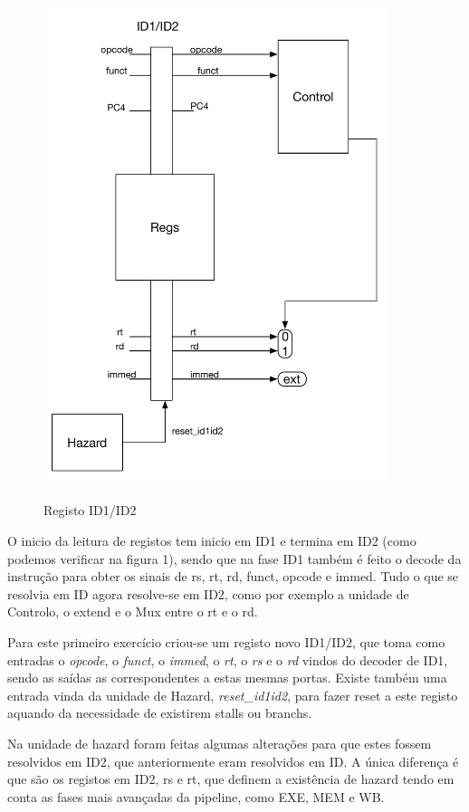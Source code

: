 \documentclass[pdftex,12pt,a4paper]{report}
\begin{document}
\begin{figure}[!htb]
\center
 \includegraphics[width=100mm,scale=1]{ID1ID2ex1.pdf}
 \caption{\\ Registo ID1/ID2}
 \label{fig:ex1RegID1ID2}
\end{figure}

O inicio da leitura de registos tem inicio em ID1 e termina em ID2 (como podemos verificar na figura 1), sendo que na fase ID1 também é feito o decode da instrução para obter os sinais de rs, rt, rd, funct, opcode e immed.  Tudo o que se resolvia em ID agora resolve-se em ID2, como por exemplo a unidade de Controlo, o extend e o Mux entre o rt e o rd.

Para este primeiro exercício criou-se um registo novo ID1/ID2, que toma como entradas o \textit{opcode}, o \textit{funct}, o \textit{immed}, o \textit{rt}, o \textit{rs} e o \textit{rd} vindos do decoder de ID1, sendo as saídas as correspondentes a estas mesmas portas. Existe também uma entrada vinda da unidade de Hazard, \textit{reset\_id1id2}, para fazer reset a este registo aquando da necessidade de existirem stalls ou branchs.

Na unidade de hazard foram feitas algumas alterações para que estes fossem resolvidos em ID2, que anteriormente eram resolvidos em ID. A única diferença é que são os registos em ID2, rs e rt, que definem a existência de hazard tendo em conta as fases mais avançadas da pipeline, como EXE, MEM e WB.
\end{document}
